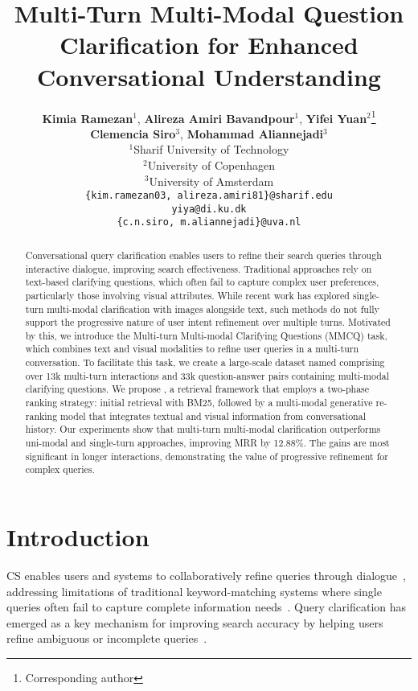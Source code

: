 \documentclass[11pt]{article}
\title{Multi-Turn Multi-Modal Question Clarification for Enhanced Conversational Understanding}
\author{
    \textbf{Kimia Ramezan}$^1$, \textbf{Alireza Amiri Bavandpour}$^1$, \textbf{Yifei Yuan}$^2$\thanks{Corresponding author} \\ 
    \textbf{Clemencia Siro}$^3$, \textbf{Mohammad Aliannejadi}$^3$ \\
    $^1$Sharif University of Technology \\
    $^2$University of Copenhagen \\
    $^3$University of Amsterdam \\
    \texttt{\{kim.ramezan03, alireza.amiri81\}@sharif.edu} \\
    \texttt{yiya@di.ku.dk} \\
    \texttt{\{c.n.siro, m.aliannejadi\}@uva.nl}
}
\begin{document}
\maketitle

\begin{abstract}

Conversational query clarification enables users to refine their search queries through interactive dialogue, improving search effectiveness. Traditional approaches rely on text-based clarifying questions, which often fail to capture complex user preferences, particularly those involving visual attributes. While recent work has explored single-turn multi-modal clarification with images alongside text, such methods do not fully support the progressive nature of user intent refinement over multiple turns. Motivated by this, we introduce the Multi-turn Multi-modal Clarifying Questions (MMCQ) task, which combines text and visual modalities to refine user queries in a multi-turn conversation. To facilitate this task, we create a large-scale dataset named \OurData{} comprising over 13k multi-turn interactions and 33k question-answer pairs containing multi-modal clarifying questions.
We propose \OurModel{}, a retrieval framework that employs a two-phase ranking strategy: initial retrieval with BM25, followed by a multi-modal generative re-ranking model that integrates textual and visual information from conversational history. Our experiments show that multi-turn multi-modal clarification outperforms uni-modal and single-turn approaches, improving MRR by 12.88\%. The gains are most significant in longer interactions, demonstrating the value of progressive refinement for complex queries.


\end{abstract}

\section{Introduction}


\Ac{CS} enables users and systems to collaboratively refine queries through dialogue~\cite{Radlinski2017ATF}, addressing limitations of traditional keyword-matching systems where single queries often fail to capture complete information needs~\cite{DBLP:journals/corr/abs-1907-06554,zamani-2020-generating}. Query clarification has emerged as a key mechanism for improving search accuracy by helping users refine ambiguous or incomplete queries~\cite{DBLP:journals/corr/abs-1901-05415,DBLP:journals/corr/abs-1805-04655}.
\end{document}
